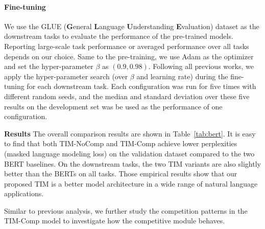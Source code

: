 \paragraph{Fine-tuning}

We use the GLUE (\textbf{G}eneral \textbf{L}anguage \textbf{U}nderstanding \textbf{E}valuation) dataset \citep{DBLP:journals/corr/abs-1804-07461} as the downstream tasks to evaluate the performance of the pre-trained models. Reporting large-scale task performance or averaged performance over all tasks depends on our choice.  Same to the pre-training, we use Adam as the optimizer and set the hyper-parameter $\beta$ as $(0.9,0.98)$. Following all previous works, we apply the hyper-parameter search (over $\beta$ and learning rate) during the fine-tuning for each downstream task. Each configuration was run for five times with different random seeds, and the median and standard deviation over these five results on the development set was be used as the performance of one configuration. 

\textbf{Results}
The overall comparison results are shown in Table~\ref{tab:bert}. It is easy to find that both TIM-NoComp and TIM-Comp achieve lower perplexities (masked language modeling loss) on the validation dataset compared to the two BERT baselines. On the downstream tasks, the two TIM variants are also slightly better than the BERTs on all tasks. Those empirical results show that our proposed TIM is a better model architecture in a wide range of natural language applications.

Similar to previous analysis, we further study the competition patterns in the TIM-Comp model to investigate how the competitive module behaves. 

\clearpage



